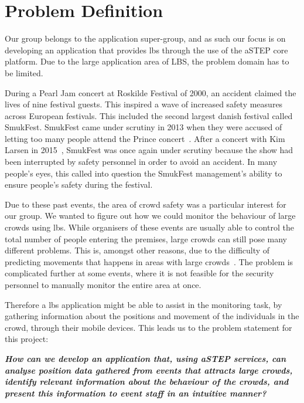 \section{Problem Definition} \label{sec:problem_def}
Our group belongs to the application super-group, and as such our focus is on developing an application that provides \gls{lbs} through the use of the aSTEP core platform. Due to the large application area of LBS, the problem domain has to be limited.

During a Pearl Jam concert at Roskilde Festival of 2000, an accident claimed the lives of nine festival guests\cite{roskilde}. This inspired a wave of increased safety measures across European festivals. This included the second largest danish festival called SmukFest. SmukFest came under scrutiny in 2013 when they were accused of letting too many people attend the Prince concert~\cite{smukfestPrince}. After a concert with Kim Larsen in 2015~\cite{kimlarsen}, SmukFest was once again under scrutiny because the show had been interrupted by safety personnel in order to avoid an accident. In many people's eyes, this called into question the SmukFest management's ability to ensure people's safety during the festival.

Due to these past events, the area of crowd safety was a particular interest for our group. We wanted to figure out how we could monitor the behaviour of large crowds using \gls{lbs}. While organisers of these events are usually able to control the total number of people entering the premises, large crowds can still pose many different problems. This is, amongst other reasons, due to the difficulty of predicting movements that happens in areas with large crowds~\cite{wirz2012inferring}. The problem is complicated further at some events, where it is not feasible for the security personnel to manually monitor the entire area at once.

Therefore a \gls{lbs} application might be able to assist in the monitoring task, by gathering information about the positions and movement of the individuals in the crowd, through their mobile devices. This leads us to the problem statement for this project:

\vspace{0.5 cm}
\begin{center}
	\textbf{\textit{How can we develop an application that, using aSTEP services, can analyse position data gathered from events that attracts large crowds, identify relevant information about the behaviour of the crowds, and present this information to event staff in an intuitive manner?}}
\end{center}
